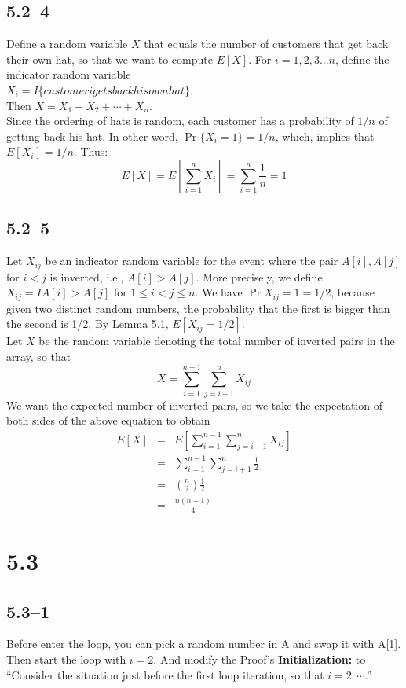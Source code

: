 \documentclass{article}
\begin{document}
\subsection*{5.2--4}
Define a random variable $X$ that equals the number of customers that get back their
own hat, so that we want to compute $E[X]$.
For $i = 1, 2, 3\ldots{}n$, define the indicator random variable\\
$X_i = I\{customer i gets back his own hat\}$.\\
Then $X = X_1 + X_2 + \cdots{} + X_n$.\\
Since the ordering of hats is random, each customer has a probability of $1/n$
of getting back his hat. In other word, $\Pr\{X_i = 1\} = 1/n$, which, implies
that $E[X_i] = 1/n$. Thus:
\[E[X] = E[\sum_{i = 1}^n X_i] = \sum_{i = 1}^n\frac{1}{n} = 1\]

\subsection*{5.2--5}
Let $X_{ij}$ be an indicator random variable for the event where the pair $A[i],
A[j]$ for $i < j$ is inverted, i.e., $A[i] > A[j]$. More precisely, we define
$X_{ij} = I{A[i] > A[j]}$ for $1 \le i < j \le n$. We have $\Pr{X_{ij} = 1} =
1/2$, because given two distinct random numbers, the probability that the first
is bigger than the second is 1/2, By Lemma 5.1, $E[X_{ij} = 1/2]$.\\
Let $X$ be the random variable denoting the total number of inverted pairs in
the array, so that
\[X = \sum_{i = 1}^{n-1}\sum_{j = i + 1}^n\!\!X_{ij}\]
We want the expected number of inverted pairs, so we take the expectation of
both sides of the above equation to obtain
\begin{eqnarray*}
E[X] &=& E[\sum_{i = 1}^{n - 1}\sum_{j = i + 1}^n\!\!X_{ij}]\\
  &=& \sum_{i = 1}^{n - 1}\sum_{j = i + 1}^n \frac{1}{2}\\
  &=& \binom{n}{2}\frac{1}{2}\\
  &=& \frac{n(n-1)}{4}
\end{eqnarray*}


\section*{5.3}
\subsection*{5.3--1}
Before enter the loop, you can pick a random number in A and swap it with A[1].
Then start the loop with $i = 2$. And modify the Proof's
\textbf{Initialization:} to ``Consider the situation just before the first loop
iteration, so that $i = 2~~\cdots{}$.''
\end{document}
